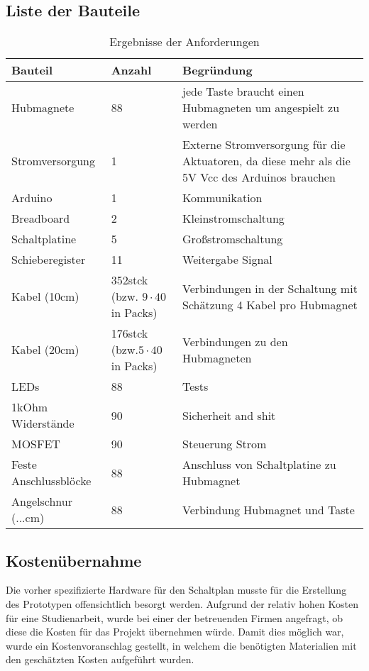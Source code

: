 \subsection{Liste der Bauteile}
\begin{table}[htbp]
    \centering
    \begin{tabular}{|m{3.8cm}|m{1.7cm}|m{8cm}|}
        \hline
        \textbf{Bauteil} &  \textbf{Anzahl} & \textbf{Begründung}  \\
        \hline
        Hubmagnete & 88 & jede Taste braucht einen Hubmagneten um angespielt zu werden \\ %
        \hline
        Stromversorgung & 1 & Externe Stromversorgung für die Aktuatoren, da diese mehr als die 5V Vcc des Arduinos brauchen \\
        \hline
        Arduino & 1 & Kommunikation \\
        \hline
        Breadboard & 2 & Kleinstromschaltung \\
        \hline
        Schaltplatine & 5 & Großstromschaltung\\ %
        \hline
        Schieberegister & 11 & Weitergabe Signal\\
        \hline
        Kabel (10cm) & 352stck (bzw. $9\cdot40$ in Packs) & Verbindungen in der Schaltung mit Schätzung 4 Kabel pro Hubmagnet\\
        \hline
        Kabel (20cm) & 176stck (bzw.$5\cdot40$ in Packs) & Verbindungen zu den Hubmagneten \\
        \hline
        LEDs & 88 & Tests \\
        \hline
        1kOhm Widerstände & 90 & Sicherheit and shit \\
        \hline
        MOSFET & 90 & Steuerung Strom \\
        \hline
        Feste Anschlussblöcke & 88 & Anschluss von Schaltplatine zu Hubmagnet\\
        \hline
        Angelschnur (...cm) & 88 & Verbindung Hubmagnet und Taste \\
        \hline
    \end{tabular}
    \caption{Ergebnisse der Anforderungen}
    \label{table:Bauteile}
\end{table}

\subsection{Kostenübernahme}
Die vorher spezifizierte Hardware für den Schaltplan musste für die Erstellung des Prototypen offensichtlich besorgt werden.
Aufgrund der relativ hohen Kosten für eine Studienarbeit, wurde bei einer der betreuenden Firmen angefragt, ob diese die Kosten für das Projekt übernehmen würde.
Damit dies möglich war, wurde ein Kostenvoranschlag gestellt, in welchem die benötigten Materialien mit den geschätzten Kosten aufgeführt wurden. %

